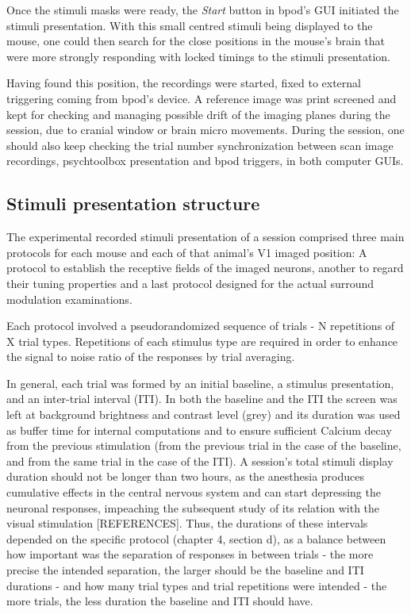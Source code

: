 Once the stimuli masks were ready, the \textit{Start} button in bpod's GUI initiated the stimuli presentation. With this small centred stimuli being displayed to the mouse, one could then search for the close positions in the mouse's brain that were more strongly responding with locked timings to the stimuli presentation. 

Having found this position, the recordings were started, fixed to external triggering coming from bpod's device. A reference image was print screened and kept for checking and managing possible drift of the imaging planes during the session, due to cranial window or brain micro movements. During the session, one should also keep checking the trial number synchronization between scan image recordings, psychtoolbox presentation and bpod triggers, in both computer GUIs.

\subsection{Stimuli presentation structure}

The experimental recorded stimuli presentation of a session comprised three main protocols for each mouse and each of that animal's V1 imaged position: A protocol to establish the receptive fields of the imaged neurons, another to regard their tuning properties  and a last protocol designed for the actual surround modulation examinations. 

Each protocol involved a pseudorandomized sequence of trials - N repetitions of X trial types. Repetitions of each stimulus type are required in order to enhance the signal to noise ratio of the responses by trial averaging. 

In general, each trial was formed by an initial baseline, a stimulus presentation, and an inter-trial interval (ITI). In both the baseline and the ITI the screen was left at background brightness and contrast level (grey) and its duration was used as buffer time for internal computations and to ensure sufficient Calcium decay from the previous stimulation (from the previous trial in the case of the baseline, and from the same trial in the case of the ITI). A session's total stimuli display duration should not be longer than two hours, as the anesthesia produces cumulative effects in the central nervous system and can start depressing the neuronal responses, impeaching the subsequent study of its relation with the visual stimulation [REFERENCES]. Thus, the durations of these intervals depended on the specific protocol (chapter 4, section d), as a balance between how important was the separation of responses in between trials - the more precise the intended separation, the larger should be the baseline and ITI durations - and how many trial types and trial repetitions were intended - the more trials, the less duration the baseline and ITI should have.

